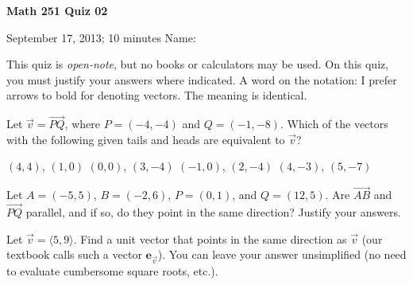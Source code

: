 \documentclass[12pt]{exam}
\begin{document}
\noindent
\textbf{{\large Math 251 \hfill Quiz 02}}

\noindent
September 17, 2013; 10 minutes \hfill Name: \underline{\hspace{3in}} 

\noindent

\noindent
This quiz is \emph{open-note}, but no books or calculators may be used.
On this quiz, you must justify your answers where indicated. A word on
the notation: I prefer arrows to bold for denoting vectors. The meaning
is identical.

\begin{questions} 


\question[4] Let $\vec{v} = \overrightarrow{PQ}$, where $P = (-4,-4)$ and $Q = (-1,-8)$. Which of the vectors with the following given tails and heads are equivalent to $\vec{v}$?

\begin{choices}
    \choice $(4, 4)$, $(1, 0)$
    \choice $(0,0)$, $(3, -4)$
    \choice $(-1,0)$, $(2,-4)$
    \choice $(4, -3)$, $(5, -7)$
\end{choices}


\question[4] Let $A = (-5, 5)$, $B = (-2, 6)$, $P = (0,1)$, and $Q = (12,5)$. Are $\overrightarrow{AB}$ and $\overrightarrow{PQ}$ parallel, and if so, do they point in the same direction? Justify your answers.


\question[4] Let $\vec{v} = \langle 5, 9 \rangle$. Find a unit vector that points in the same direction as $\vec{v}$ (our textbook calls such a vector $\mathbf{e}_{\vec{v}}$). You can leave your answer unsimplified (no need to evaluate cumbersome square roots, etc.).


\end{questions} 
\end{document}
